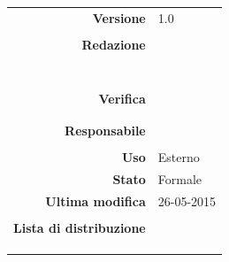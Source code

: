 \begin{titlepage}
\begin{center}
	\begin{table}[h]
	\begin{center}
	\begin{tabular}{r | l}
		\textbf{Versione} & 1.0 \\ \\
		\textbf{Redazione} & \VeFe \\ 
			& \CoMa \\ 
			& \CaMa \\
			& \MaMo \\
			& \ReAn \\
			& \GoIs \\
			& \DeEn \\ \\
		\textbf{Verifica} & \MaMo \\
			& \ReAn \\ \\
		\textbf{Responsabile} & \GoIs \\ \\
		\textbf{Uso} & Esterno \\
		\textbf{Stato} & Formale \\
		\textbf{Ultima modifica} & 26-05-2015 \\ \\
		\textbf{Lista di distribuzione} & \gruppo \\ 
			& \Vardanega \\
			& \Cardin \\
			& \Zucchetti \\
	\end{tabular}
	\end{center}
	\end{table}
	\end{center}
\end{titlepage}